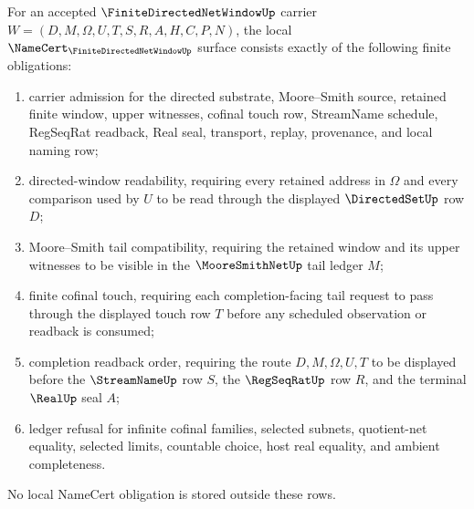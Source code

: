 \begin{theorem}\label{thm:finite-directed-net-window-namecert-obligations}
For an accepted $\FiniteDirectedNetWindowUp$ carrier $W=(D,M,\Omega,U,T,S,R,A,H,C,P,N)$, the local $\NameCert_{\FiniteDirectedNetWindowUp}$ surface consists exactly of the following finite obligations:
\begin{enumerate}
\item carrier admission for the directed substrate, Moore--Smith source, retained finite window, upper witnesses, cofinal touch row, StreamName schedule, RegSeqRat readback, Real seal, transport, replay, provenance, and local naming row;
\item directed-window readability, requiring every retained address in $\Omega$ and every comparison used by $U$ to be read through the displayed $\DirectedSetUp$ row $D$;
\item Moore--Smith tail compatibility, requiring the retained window and its upper witnesses to be visible in the $\MooreSmithNetUp$ tail ledger $M$;
\item finite cofinal touch, requiring each completion-facing tail request to pass through the displayed touch row $T$ before any scheduled observation or readback is consumed;
\item completion readback order, requiring the route $D,M,\Omega,U,T$ to be displayed before the $\StreamNameUp$ row $S$, the $\RegSeqRatUp$ row $R$, and the terminal $\RealUp$ seal $A$;
\item ledger refusal for infinite cofinal families, selected subnets, quotient-net equality, selected limits, countable choice, host real equality, and ambient completeness.
\end{enumerate}
No local NameCert obligation is stored outside these rows.
\end{theorem}
